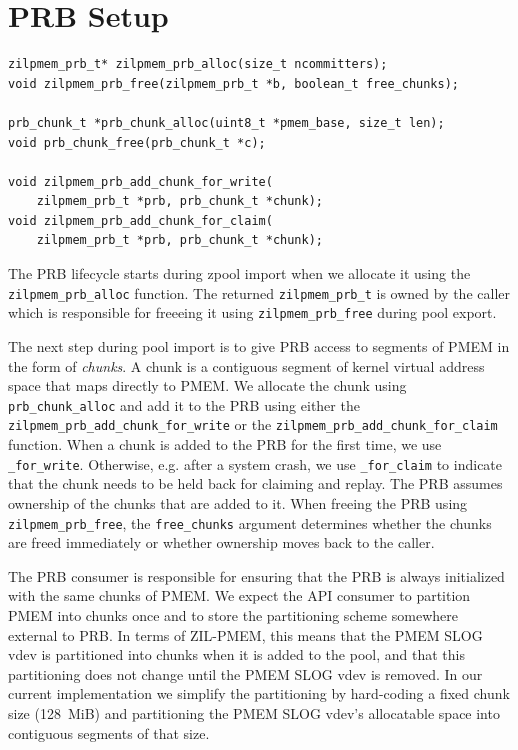 \documentclass[12pt,a4paper,twoside]{book}
\begin{document}
\section{PRB Setup}\label{di:prb:api:setup}

\begin{lstlisting}
zilpmem_prb_t* zilpmem_prb_alloc(size_t ncommitters);
void zilpmem_prb_free(zilpmem_prb_t *b, boolean_t free_chunks);

prb_chunk_t *prb_chunk_alloc(uint8_t *pmem_base, size_t len);
void prb_chunk_free(prb_chunk_t *c);

void zilpmem_prb_add_chunk_for_write(
    zilpmem_prb_t *prb, prb_chunk_t *chunk);
void zilpmem_prb_add_chunk_for_claim(
    zilpmem_prb_t *prb, prb_chunk_t *chunk);
\end{lstlisting}

The PRB lifecycle starts during zpool import when we allocate it using the \lstinline{zilpmem_prb_alloc} function.
The returned \lstinline{zilpmem_prb_t} is owned by the caller which is responsible for freeeing it using \lstinline{zilpmem_prb_free} during pool export.

The next step during pool import is to give PRB access to segments of PMEM in the form of \textit{chunks}.
A chunk is a contiguous segment of kernel virtual address space that maps directly to PMEM.
We allocate the chunk using \lstinline{prb_chunk_alloc} and add it to the PRB using either the \lstinline{zilpmem_prb_add_chunk_for_write} or the \lstinline{zilpmem_prb_add_chunk_for_claim} function.
When a chunk is added to the PRB for the first time, we use \lstinline{_for_write}.
Otherwise, e.g. after a system crash, we use \lstinline{_for_claim} to indicate that the chunk needs to be held back for claiming and replay.
The PRB assumes ownership of the chunks that are added to it.
When freeing the PRB using \lstinline{zilpmem_prb_free}, the \lstinline{free_chunks} argument determines whether the chunks are freed immediately or whether ownership moves back to the caller.

The PRB consumer is responsible for ensuring that the PRB is always initialized with the same chunks of PMEM.
We expect the API consumer to partition PMEM into chunks once and to store the partitioning scheme somewhere external to PRB.
In terms of ZIL-PMEM, this means that the PMEM SLOG vdev is partitioned into chunks when it is added to the pool, and that this partitioning does not change until the PMEM SLOG vdev is removed.
In our current implementation we simplify the partitioning by hard-coding a fixed chunk size (\SI{128}{MiB}) and partitioning the PMEM SLOG vdev's allocatable space into contiguous segments of that size.
\end{document}
